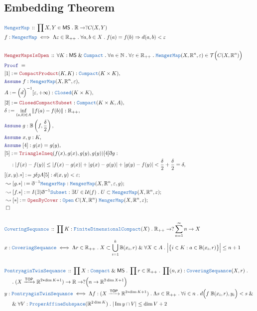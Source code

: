 \documentclass[12pt]{scrartcl}
\newcommand{\TYPE}[1]{\textcolor{NavyBlue}{\mathtt{#1}}}
\newcommand{\LOGIC}[1]{\textcolor{Blue}{\mathtt{#1}}}
\newcommand{\THM}[1]{\textcolor{Maroon}{\mathtt{#1}}}
\renewcommand{\.}{\; . \;}
\newcommand{\de}{: \kern 0.1pc =}
\newcommand{\Act}[1]{\left( #1 \right)}
\newcommand{\Theorem}[2]{& \THM{#1} \, :: \, #2 \\ & \Proof = \\ }
\newcommand{\DeclareType}[2]{& \TYPE{#1} \, :: \, #2 \\}
\newcommand{\DefineType}[3]{& #1 : \TYPE{#2} \iff #3 \\}
\newcommand{\NewLine}{\\ & \kern 1pc}
\newcommand{\Page}[1]{ \begin{align*} #1 \end{align*}   }
\newcommand{ \bd }{ \ByDef }
\renewcommand{\And}{\; \& \;}
\newcommand{\Imply}{\Rightarrow}
\newcommand{\Reals}{\mathbb{R} }
\newcommand{\Nat}{\mathbb{N} }
\DeclareMathOperator*{\im}{Im}
\newcommand{\Arrow}{\xrightarrow}
\newcommand{\Say}[3]{& #1 \de #2 : #3, \\}
\newcommand{\Conclude}[3]{& #1 \de #2 : #3; \\}
\newcommand{\DeriveConclude}[3]{& \leadsto #1 \de #2 : #3 ; \\}
\newcommand{\Assume}[2]{& \LOGIC{Assume} \; #1 : #2, \\}
\newcommand{\QED}{\; \square}
\newcommand{\EndProof}{& \QED \\}
\newcommand{\ByDef}{\eth}
\newcommand{\ByConstr}{\jmath}
\newcommand{\Proof}{\LOGIC{Proof} \; }
\newcommand{\TOP}{\mathsf{TOP}}
\newcommand{\T}{\mathcal{T}}
\newcommand{\U}{\mathcal{U}}
\newcommand{\MS}{\mathsf{MS}}
\begin{document}
\subsection{Embedding Theorem}
\Page{
	\DeclareType{MengerMap}{\prod X, Y \in \MS \. \Reals \to ?C(X,Y)}
	\DefineType{f}{MengerMap}{\Lambda \varepsilon \in \Reals_{++} \.  \forall a,b \in X \. f(a) = f(b) \Imply d(a,b) < \varepsilon}
	\\
	\Theorem{MengerMapsIsOpen}{\forall K : \MS \And \TYPE{Compact} \. \forall n \in \Nat \.   \forall \varepsilon \in \Reals_{++} \. \TYPE{MengerMap}(X,\Reals^n,\varepsilon) \in \T\Big( C( X,\Reals^n) \Big)}
	\Say{[1]}{\THM{CompactProduct}(K,K)}{\TYPE{Compact}(K \times K)}
	\Assume{f}{\TYPE{MengerMap}(X,\Reals^n,\varepsilon)}
	\Say{A}{ \Big(d\Big)^{-1}[\varepsilon,+\infty) }{\TYPE{Closed}(K \times K)}
	\Say{[2]}{\THM{ClosedCompactSubset}}{\TYPE{Compact}(K \times K, A)}
	\Say{\delta}{\inf_{(a,b) \in A} \| f(a) - f(b) \| }{\Reals_{++}}
	\Assume{g}{\mathbb{B}\Act{f,\frac{\delta}{2}}}
	\Assume{x,y}{K}
	\Assume{[4]}{g(x) = g(y)}
	\Say{[5]}{\THM{TriangleIneq}(f(x),g(x),g(y),g(y))[4]\bd g }{ \NewLine :|f(x) - f(y)| \le |f(x) -g(x)| + |g(x) - g(y)|  + | g(y) - f(y) | < \frac{\delta}{2} + \frac{\delta}{2} = \delta }
	\Conclude{[(x,y).*]}{\ByConstr \delta  \ByConstr A [5]}{ d(x,y) < \varepsilon }
	\DeriveConclude{[g.*]}{\bd^{-1} \TYPE{MengerMap}}{\TYPE{MengerMap}(X,\Reals^n, \varepsilon, g )}
	\DeriveConclude{[f.*]}{I(\exists)\bd^{-1}\TYPE{Subset}}{\exists U \in \U(f) \. U \subset \TYPE{MengerMap}(X,\Reals^n, \varepsilon) }
	\DeriveConclude{[*]}{\THM{OpenByCover}}{\TYPE{Open} \; C(X,\Reals^n) \;   \TYPE{MengerMap}(X,\Reals^n, \varepsilon) }
	\EndProof
	\\
	\DeclareType{CoveringSequance}{\prod K : \TYPE{FiniteDimensionalCompact}(X) \. \Reals_{++} \to ?\sum^\infty_{n=1} n \to X  }
	\DefineType{x}{CoveringSequance}
	{
		\Lambda r \in \Reals_{++} \. 
		X \subset \bigcup^k_{i=1}  \mathbb{B}(x_i,r) \And  
		\forall X \in A  \. \Big|   \big\{ i \in K :  a \in \mathbb{B}(x_i,r)  \big\} \Big| \le n + 1   
	}
	\\
	\DeclareType{PontryaginTwinSequance}{
		\prod X : \TYPE{Compact} \And \MS \.  
		\prod r \in \Reals_{++} \.  
		\prod  (n,x) : \TYPE{CoveringSequance}(X,r) \. \NewLine \.
		(X \Arrow{\TOP} \Reals^{2*\dim K + 1}) \to \Reals \to  ? \Big(n \to \Reals^{2\dim X + 1} \Big)  }
	\DefineType{y}{PontryaginTwinSequance}
	{
		\Lambda f : (X \Arrow{\TOP} \Reals^{2*\dim K + 1}) \.
		\Lambda s \in \Reals_{++} \.
		\forall i \in n \.    d\Big( f \; \mathbb{B}(x_i, r), y_i \Big) < s \And \NewLine \And
		\forall   V : \TYPE{ProperAffineSubspace}(\Reals^{2 \dim K}) \. 
		| \im y \cap V| \le \dim V + 2    
	}
}
\end{document}
